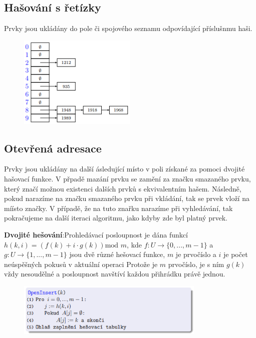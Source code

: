 \documentclass{szzclass}
\begin{document}
\subsection{Hašování s řetízky}
Prvky jsou ukládány do pole či spojového seznamu odpovídající příslušnmu haši.

\begin{figure}[h!]
\centering
\includegraphics[width=0.5\textwidth]{topics/bi-spol-05/images/hashRetizky.png}
\end{figure}

\subsection{Otevřená adresace}
Prvky jsou ukládány na další ásledující místo v poli získané za pomoci dvojité hašovací funkce. V přpadě mazání prvku se zamění za značku smazaného prvku, který značí možnou existenci dalších prvků s ekvivalentním hašem. 
Následně, pokud narazíme na značku smazaného prvku při vkládání, tak se prvek vloží na míísto značky. V případě, že na tuto znařku narazíme při vyhledávání, tak pokračujeme na další iteraci algoritmu, jako kdyby zde byl platný prvek.


\textbf{Dvojité hešování}:\newline Prohledávací posloupnost je dána funkcí
$h(k, i) = (f(k) + i \cdot g(k)) \text{mod } m$, kde $f : U \rightarrow \{0, . . . , m - 1\}$ a
$g : U → \{1, . . . , m - 1\}$ jsou dvě různé hešovací funkce, $m$ je
prvočíslo a $i$ je počet neúspěšných pokusů v aktuální operaci
Protože je $m$ prvočíslo, je s ním $g(k)$ vždy nesoudělné a
posloupnost navštíví každou přihrádku právě jednou.

\begin{figure}[h!]
\centering
\includegraphics[width=0.8\textwidth]{topics/bi-spol-05/images/hashOpenInsert.png}
\end{figure}
\end{document}
